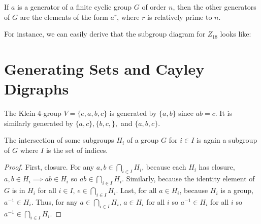 \begin{corollary}
    If $a$ is a generator of a finite cyclic group $G$ of order $n$, then the other generators of $G$ are the elements of the form $a^r$, where $r$ is relatively prime to $n$. 
\end{corollary}
\begin{example}
    For instance, we can easily derive that the subgroup diagram for $Z_{18}$ looks like:
\end{example}

\section{Generating Sets and Cayley Digraphs}

\begin{example}
    The Klein 4-group $V = \{e,a,b,c\}$ is generated by $\{a,b\}$ since $ab =c$. It is similarly generated by $\{a,c\},\{b,c,\},$ and $\{a,b,c\}$.
\end{example}
\begin{theorem}
    The intersection of some subgroups $H_i$ of a group $G$ for $i \in I$ is again a subgroup of $G$ where $I$ is the set of indices.
\end{theorem}
\begin{proof}
    First, closure. For any $a,b \in \bigcap_{i\in I}H_i$, because each $H_i$ has closure, $a,b \in H_i \implies ab \in H_i$ so $ab \in \bigcap_{i\in I}H_i$. Similarly, because the identity element of $G$ is in $H_i$ for all $i \in I$, $e \in \bigcap_{i\in I}H_i$. Last, for all $a \in H_i$, because $H_i$ is a group, $a^{-1} \in H_i$. Thus, for any $a \in \bigcap_{i \in I}H_i$, $a \in H_i$ for all $i$ so $a^{-1} \in H_i$ for all $i$ so $a^{-1} \in \bigcap_{i \in I}H_i$. 
\end{proof}
